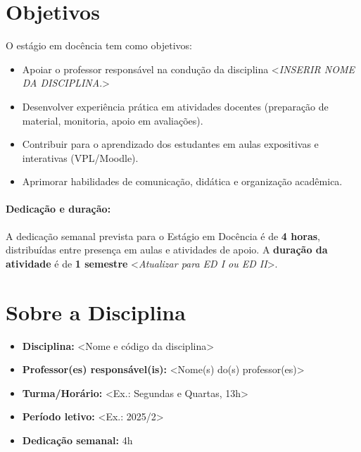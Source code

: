 \documentclass[12pt, a4paper]{article}
\begin{document}
\maketitle


\section{Objetivos} \label{sec:objetivos}
O estágio em docência tem como objetivos:
\begin{itemize}
    \item Apoiar o professor responsável na condução da disciplina <\textit{INSERIR NOME DA DISCIPLINA}.>
    \item Desenvolver experiência prática em atividades docentes (preparação de material, monitoria, apoio em avaliações).
    \item Contribuir para o aprendizado dos estudantes em aulas expositivas e interativas (VPL/Moodle).
    \item Aprimorar habilidades de comunicação, didática e organização acadêmica.
\end{itemize}

\paragraph{Dedicação e duração:}A dedicação semanal prevista para o Estágio em Docência é de \textbf{4 horas}, distribuídas entre presença em aulas e atividades de apoio. A \textbf{duração da atividade} é de \textbf{1 semestre} <\textit{Atualizar para ED I ou ED II}>.

\section{Sobre a Disciplina} \label{sec:disciplina}


\begin{itemize}
    \item \textbf{Disciplina:} <Nome e código da disciplina>
    \item \textbf{Professor(es) responsável(is):} <Nome(s) do(s) professor(es)>
    \item \textbf{Turma/Horário:} <Ex.: Segundas e Quartas, 13h>
    \item \textbf{Período letivo:} <Ex.: 2025/2>
    \item \textbf{Dedicação semanal:} 4h
\end{itemize}
\end{document}
